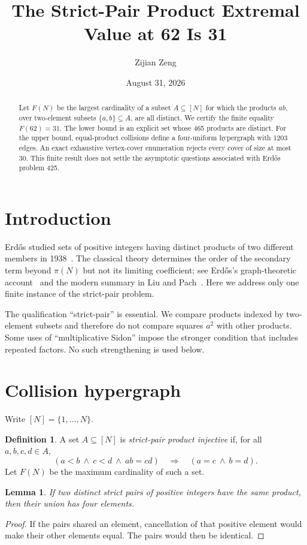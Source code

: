 \documentclass[11pt]{amsart}
\title{The Strict-Pair Product Extremal Value at 62 Is 31}
\author{Zijian Zeng}
\date{August 31, 2026}
\newtheorem{lemma}[theorem]{Lemma}
\theoremstyle{definition}
\newtheorem{definition}[theorem]{Definition}
\begin{document}
\begin{abstract}
Let $F(N)$ be the largest cardinality of a subset $A\subseteq[N]$ for which
the products $ab$, over two-element subsets $\{a,b\}\subseteq A$, are all
distinct.  We certify the finite equality $F(62)=31$.  The lower bound is an
explicit set whose 465 products are distinct.  For the upper bound,
equal-product collisions define a four-uniform hypergraph with 1203 edges.
An exact exhaustive vertex-cover enumeration rejects every cover of size at
most 30.  This finite result does not settle the asymptotic questions
associated with Erd\H{o}s problem 425.
\end{abstract}
\maketitle

\section{Introduction}
Erd\H{o}s studied sets of positive integers having distinct products of two
different members in 1938~\cite{Erdos1938}.  The classical theory determines
the order of the secondary term beyond $\pi(N)$ but not its limiting
coefficient; see Erd\H{o}s's graph-theoretic account~\cite{Erdos1969} and the
modern summary in Liu and Pach~\cite{LiuPach2019}.  Here we address only one
finite instance of the strict-pair problem.

The qualification ``strict-pair'' is essential.  We compare products indexed
by two-element subsets and therefore do not compare squares $a^2$ with other
products.  Some uses of ``multiplicative Sidon'' impose the stronger condition
that includes repeated factors.  No such strengthening is used below.

\section{Collision hypergraph}
Write $[N]=\{1,\ldots,N\}$.
\begin{definition}
A set $A\subseteq[N]$ is \emph{strict-pair product injective} if, for all
$a,b,c,d\in A$,
\[
 (a<b\ \wedge\ c<d\ \wedge\ ab=cd)
 \quad\Longrightarrow\quad (a=c\ \wedge\ b=d).
\]
Let $F(N)$ be the maximum cardinality of such a set.
\end{definition}

\begin{lemma}\label{lem:four}
If two distinct strict pairs of positive integers have the same product, then
their union has four elements.
\end{lemma}
\begin{proof}
If the pairs shared an element, cancellation of that positive element would
make their other elements equal.  The pairs would then be identical.
\end{proof}
\end{document}
